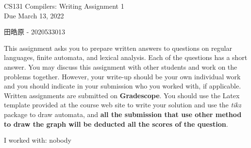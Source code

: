 \documentclass[10pt]{article}
\begin{document}
\begin{center}
    \Large CS131 Compilers: Writing Assignment 1\\Due March 13, 2022
\end{center}

\begin{center}
    \LARGE 田皓原 - 2020533013
\end{center}


This assignment asks you to prepare written answers to questions on
regular languages, finite automata, and lexical analysis.  Each of the
questions has a short answer.  You may discuss this assignment with
other students and work on the problems together.  However, your
write-up should be your own individual work and you should indicate in your submission who you worked
with, if applicable.  Written assignments are submitted on \textbf{Gradescope}.
You should use the Latex template provided at the course web site to write your solution and use the \emph{tikz} package to draw
automata, and \textbf{all the submission that use other method to draw the graph will be deducted all the scores of the question}.

\begin{center}
    I worked with: nobody
\end{center}
\end{document}
